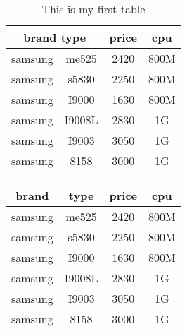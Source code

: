 \documentclass{book} %
\begin{document}
\eject  %

\begin{table}
  \centering    %
  \begin{tabular}{|c|c|c|c|}
  \hline
\multicolumn{2}{|c|}{brand  type} & price & cpu\\
  \hline
samsung & me525 & 2420 & 800M\\
samsung & s5830 & 2250 & 800M\\
samsung & I9000 & 1630 & 800M\\
samsung & I9008L & 2830 & 1G\\
samsung & I9003 & 3050 & 1G\\
samsung & 8158 & 3000 & 1G\\
  \hline
\end{tabular}
  \caption{This is my first table}  %
\end{table}

\eject  %


\begin{tabular}{|cccc|}
  \hline
brand & type & price & cpu\\
  \hline
samsung & me525 & 2420 & 800M\\
samsung & s5830 & 2250 & 800M\\
samsung & I9000 & 1630 & 800M\\
\cline{2-3}     %
samsung & I9008L & 2830 & 1G\\
samsung & I9003 & 3050 & 1G\\
samsung & 8158 & 3000 & 1G\\
  \hline
\end{tabular}
\end{document}
